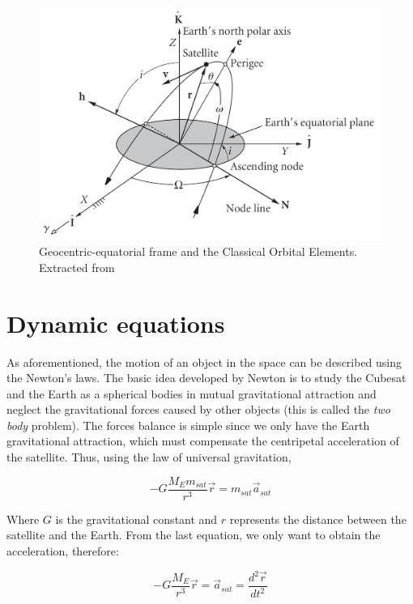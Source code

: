 \begin{figure}[H]
\centering
\includegraphics[scale=.3]{./Geometry/fig-Ch1-Geometry/COE.png}
\caption{Geocentric-equatorial frame and the Classical Orbital Elements. Extracted from \cite{Curtis2010}}
\label{fig:COE}
\end{figure}

\section{Dynamic equations}
As aforementioned, the motion of an object in the space can be described using the Newton's laws. The basic idea developed by Newton is to study the Cubesat and the Earth as a spherical bodies in mutual gravitational attraction and neglect the gravitational forces caused by other objects (this is called the \textit{two body} problem). The forces balance is simple since we only have the Earth gravitational attraction, which must compensate the centripetal acceleration of the satellite. Thus, using the law of universal gravitation,

\begin{equation}
-G\frac{M_{E}m_{sat}}{r^3}\vec{r}=m_{sat}\vec{a}_{sat}
\end{equation}

Where $G$ is the gravitational constant and $r$ represents the distance between the satellite and the Earth. From the last equation, we only want to obtain the acceleration, therefore:

\begin{equation}
-G\frac{M_{E}}{r^3}\vec{r}=\vec{a}_{sat}=\frac{d^2 \vec{r}}{d t^2}
\end{equation}


